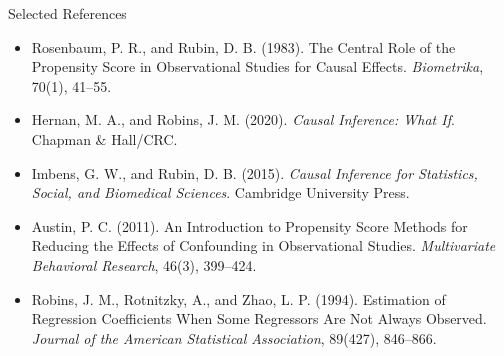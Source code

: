 \documentclass[aspectratio=169,11pt]{beamer}
\begin{document}
\begin{frame}{Selected References}
\small
\begin{itemize}
\item Rosenbaum, P. R., and Rubin, D. B. (1983). The Central Role of the Propensity Score in Observational Studies for Causal Effects. \textit{Biometrika}, 70(1), 41--55.
\item Hernan, M. A., and Robins, J. M. (2020). \textit{Causal Inference: What If}. Chapman \& Hall/CRC.
\item Imbens, G. W., and Rubin, D. B. (2015). \textit{Causal Inference for Statistics, Social, and Biomedical Sciences}. Cambridge University Press.
\item Austin, P. C. (2011). An Introduction to Propensity Score Methods for Reducing the Effects of Confounding in Observational Studies. \textit{Multivariate Behavioral Research}, 46(3), 399--424.
\item Robins, J. M., Rotnitzky, A., and Zhao, L. P. (1994). Estimation of Regression Coefficients When Some Regressors Are Not Always Observed. \textit{Journal of the American Statistical Association}, 89(427), 846--866.
\end{itemize}
\end{frame}

\contactslide
\end{document}
